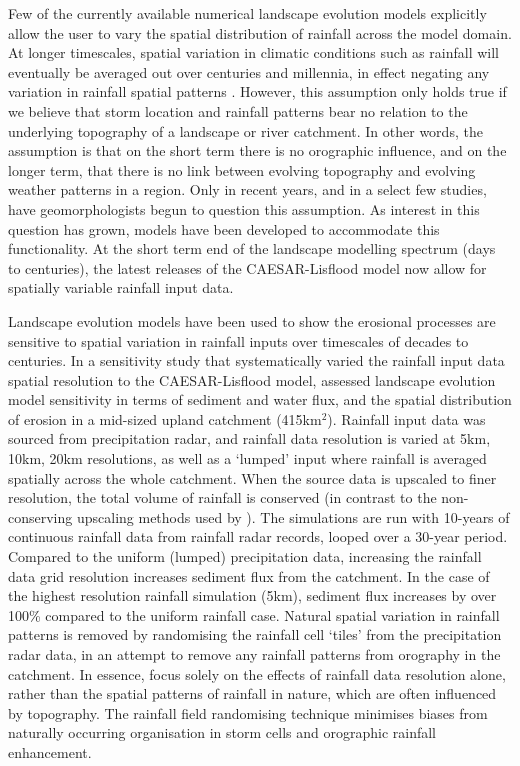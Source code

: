 Few of the currently available numerical landscape evolution models explicitly allow the user to vary the spatial distribution of rainfall across the model domain. At longer timescales, spatial variation in climatic conditions such as rainfall will eventually be averaged out over centuries and millennia, in effect negating any variation in rainfall spatial patterns \citep{solyom2007importance,Tucker2010}. However, this assumption only holds true if we believe that storm location and rainfall patterns bear no relation to the underlying topography of a landscape or river catchment. In other words, the assumption is that on the short term there is no orographic influence, and on the longer term, that there is no link between evolving topography and evolving weather patterns in a region. Only in recent years, and in a select few studies, have geomorphologists begun to question this assumption. As interest in this question has grown, models have been developed to accommodate this functionality. At the short term end of the landscape modelling spectrum (days to centuries), the latest releases of the CAESAR-Lisflood model \citep{coulthard2017caesarlisflood} now allow for spatially variable rainfall input data.
 
Landscape evolution models have been used to show the erosional processes are sensitive to spatial variation in rainfall inputs over timescales of decades to centuries. In a sensitivity study that systematically varied the rainfall input data spatial resolution to the CAESAR-Lisflood model, \citet{coulthard2016sensitivity} assessed landscape evolution model sensitivity in terms of sediment and water flux, and the spatial distribution of erosion in a mid-sized upland catchment (415km\(^2\)). Rainfall input data was sourced from precipitation radar, and rainfall data resolution is varied at 5km, 10km, 20km resolutions, as well as a `lumped' input where rainfall is averaged spatially across the whole catchment. When the source data is upscaled to finer resolution, the total volume of rainfall is conserved (in contrast to the non-conserving upscaling methods used by \citet{nicotina2008impact}). The simulations are run with 10-years of continuous rainfall data from rainfall radar records, looped over a 30-year period. Compared to the uniform (lumped) precipitation data, increasing the rainfall data grid resolution increases sediment flux from the catchment. In the case of the highest resolution rainfall simulation (5km), sediment flux increases by over 100\% compared to the uniform rainfall case. Natural spatial variation in rainfall patterns is removed by randomising the rainfall cell `tiles' from the precipitation radar data, in an attempt to remove any rainfall patterns from orography in the catchment. In essence, \citet{coulthard2016sensitivity} focus solely on the effects of rainfall data resolution alone, rather than the spatial patterns of rainfall in nature, which are often influenced by topography. The rainfall field randomising technique minimises biases from naturally occurring organisation in storm cells and orographic rainfall enhancement. 

